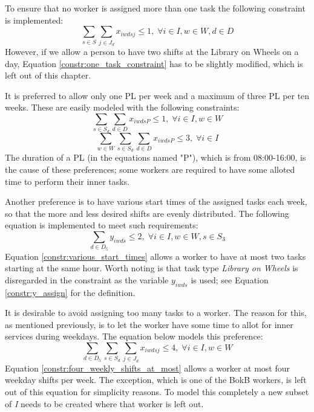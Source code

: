 To ensure that no worker is assigned more than one task the following constraint is implemented:
\begin{equation} \label{constr:one_task_constraint}
\sum_{s\in S}\sum_{j\in J_d} x_{iwdsj} \leq 1, \; \forall i\in I, w \in W, d\in D
\end{equation}
However, if we allow a person to have two shifts at the Library on Wheels on a day, Equation \ref{constr:one_task_constraint} has to be slightly modified, which is left out of this chapter.

It is preferred to allow only one PL per week and a maximum of three PL per ten weeks. These are easily modeled with the following constraints:
\begin{equation} \label{constr:one_PL}
\sum_{s \in S_d}\sum_{d \in D} x_{iwdsP} \leq 1, \; \forall i\in I, w \in W
\end{equation}
\begin{equation} \label{constr:three_PL}
\sum_{w \in W}\sum_{s \in S_d}\sum_{d \in D} x_{iwdsP} \leq 3, \; \forall i\in I
\end{equation}
The duration of a PL (in the equations named "P"), which is from 08:00-16:00, is the cause of these preferences; some workers are required to have some alloted time to perform their inner tasks.

Another preference is to have various start times of the assigned tasks each week, so that the more and less desired shifts are evenly distributed. The following equation is implemented to meet such requirements:
\begin{equation} \label{constr:various_start_times}
\sum_{d \in D_5} y_{iwds} \leq 2, \; \forall i\in I, w \in W, s \in S_3
\end{equation}
Equation \ref{constr:various_start_times} allows a worker to have at most two tasks starting at the same hour. Worth noting is that task type \textit{Library on Wheels} is disregarded in the constraint as the variable $y_{iwds}$ is used; see Equation \ref{constr:y_assign} for the definition.

It is desirable to avoid assigning too many tasks to a worker. The reason for this, as mentioned previously, is to let the worker have some time to allot for inner services during weekdays. The equation below models this preference:
\begin{equation} \label{constr:four_weekly_shifts_at_most}
\sum_{d \in D_5}\sum_{s \in S_d}\sum_{j \in J_d} x_{iwdsj} \leq 4, \; \forall i\in I, w \in W
\end{equation}
Equation \ref{constr:four_weekly_shifts_at_most} allows a worker at most four weekday shifts per week. The exception, which is one of the BokB workers, is left out of this equation for simplicity reasons. To model this completely a new subset of \textit{I} needs to be created where that worker is left out. 

